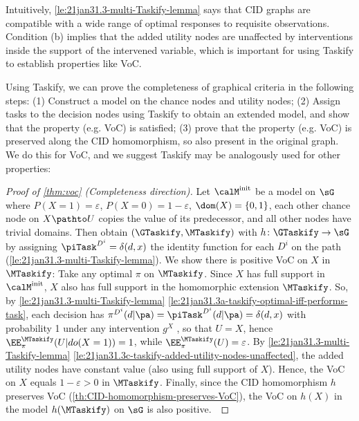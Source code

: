 


Intuitively, \cref{le:21jan31.3-multi-Taskify-lemma} says that CID graphs are compatible with a wide range of optimal responses to requisite observations.
Condition (b) implies that the added utility nodes are unaffected by interventions inside the support of the intervened variable, which is important for using Taskify to establish properties like VoC.

Using Taskify, we can prove the completeness of graphical criteria in the following steps: (1) Construct a model on the chance nodes and utility nodes; (2) Assign tasks to the decision nodes using Taskify to obtain an extended model,
and show that the property (e.g. VoC) is satisfied;
(3) prove that the property (e.g. VoC) is preserved along the CID homomorphism, so also present in the original graph.
We do this for VoC, and we suggest Taskify may be analogously used for other properties: 








\begin{proof}[Proof of \cref{thm:voc} (Completeness direction)]
\newcommand{\Minitial}{\calM^\mathrm{init}}
Let $\Minitial$ be a model on $\sG$ where 
$P(X=1)=\varepsilon$, $P(X=0)=1-\varepsilon$, $\dom(X)=\{0,1\}$, each other 
chance node 
on $X \pathto U$
copies 
the value of its predecessor, 
and all other nodes have trivial domains.
Then obtain $(\GTaskify, \MTaskify)$ with $h\colon \GTaskify\to \sG$ by 
assigning $\piTask^{D^i}=\delta(d,x)$ the identity function for each $D^i$ on the path (\cref{le:21jan31.3-multi-Taskify-lemma}).
We show there is positive VoC on $X$ in $\MTaskify$: Take any optimal $\pi$ on $\MTaskify$. Since $X$ has full support in $\Minitial$, $X$ also has
full support in the homomorphic extension $\MTaskify$. So,
by \cref{le:21jan31.3-multi-Taskify-lemma} \ref{le:21jan31.3a-taskify-optimal-iff-performs-task}, 
each decision has $\pi^{D^i}(d|\pa)=\piTask^{D^i}(d|\pa)=\delta(d,x)$ with probability 1
under any intervention $g^X$ , 
so that $U=X$, hence $\EE_{\pi}^{\MTaskify}(U | do(X=1)) = 1$, while $\EE_{\pi}^{\MTaskify}(U) = \varepsilon$. 
By \cref{le:21jan31.3-multi-Taskify-lemma} \ref{le:21jan31.3c-taskify-added-utility-nodes-unaffected}, the added utility nodes have constant value (also using full support of $X$). Hence, the VoC on $X$ equals $1-\varepsilon>0$ in $\MTaskify$. Finally, since the CID homomorphism $h$ preserves VoC (\cref{th:CID-homomorphism-preserves-VoC}), the VoC on $h(X)$ in the model $h(\MTaskify)$ on $\sG$ is also positive.~ 
\end{proof}